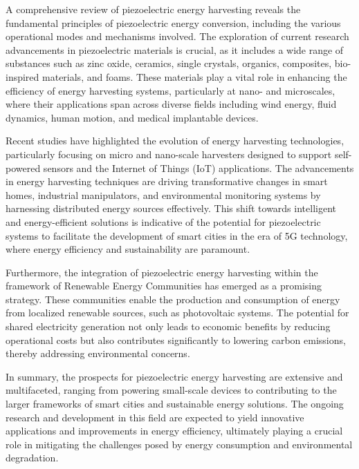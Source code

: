 \documentclass[runningheads]{llncs}
\begin{document}
A comprehensive review of piezoelectric energy harvesting reveals the fundamental principles of piezoelectric energy conversion, including the various operational modes and mechanisms involved. The exploration of current research advancements in piezoelectric materials is crucial, as it includes a wide range of substances such as zinc oxide, ceramics, single crystals, organics, composites, bio-inspired materials, and foams. These materials play a vital role in enhancing the efficiency of energy harvesting systems, particularly at nano- and microscales, where their applications span across diverse fields including wind energy, fluid dynamics, human motion, and medical implantable devices.

Recent studies have highlighted the evolution of energy harvesting technologies, particularly focusing on micro and nano-scale harvesters designed to support self-powered sensors and the Internet of Things (IoT) applications. The advancements in energy harvesting techniques are driving transformative changes in smart homes, industrial manipulators, and environmental monitoring systems by harnessing distributed energy sources effectively. This shift towards intelligent and energy-efficient solutions is indicative of the potential for piezoelectric systems to facilitate the development of smart cities in the era of 5G technology, where energy efficiency and sustainability are paramount.

Furthermore, the integration of piezoelectric energy harvesting within the framework of Renewable Energy Communities has emerged as a promising strategy. These communities enable the production and consumption of energy from localized renewable sources, such as photovoltaic systems. The potential for shared electricity generation not only leads to economic benefits by reducing operational costs but also contributes significantly to lowering carbon emissions, thereby addressing environmental concerns.

In summary, the prospects for piezoelectric energy harvesting are extensive and multifaceted, ranging from powering small-scale devices to contributing to the larger frameworks of smart cities and sustainable energy solutions. The ongoing research and development in this field are expected to yield innovative applications and improvements in energy efficiency, ultimately playing a crucial role in mitigating the challenges posed by energy consumption and environmental degradation.
\end{document}
